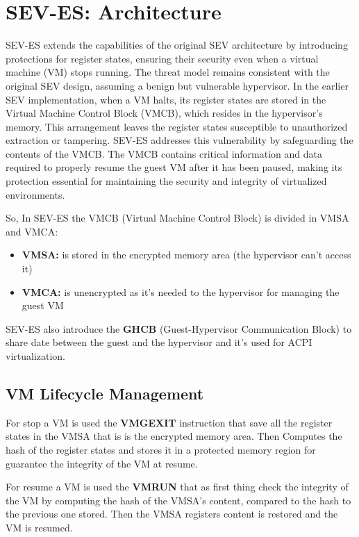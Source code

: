 \section{SEV-ES: Architecture}

SEV-ES extends the capabilities of the original SEV architecture by introducing protections for register states, 
ensuring their security even when a virtual machine (VM) stops running. 
The threat model remains consistent with the original SEV design, assuming a benign but vulnerable hypervisor. 
In the earlier SEV implementation, when a VM halts, its register states are stored in the Virtual Machine Control Block (VMCB), which resides in the hypervisor's memory. 
This arrangement leaves the register states susceptible to unauthorized extraction or tampering. SEV-ES addresses this vulnerability by safeguarding the contents of the VMCB. 
The VMCB contains critical information and data required to properly resume the guest VM after it has been paused, making its protection essential for maintaining the security and integrity of virtualized environments. \bigskip

So, In SEV-ES the VMCB (Virtual Machine Control Block) is divided in VMSA and VMCA:
\begin{itemize}
    \item \textbf{VMSA:} is stored in the encrypted memory area (the hypervisor can't access it)
    \item \textbf{VMCA:} is unencrypted as it's needed to the hypervisor for managing the guest VM
\end{itemize}

SEV-ES also introduce the \textbf{GHCB} (Guest-Hypervisor Communication Block) to share date between the guest and the hypervisor and it's used for ACPI virtualization.

\subsection{VM Lifecycle Management}

For stop a VM is used the \textbf{VMGEXIT} instruction that save all the register states in the VMSA that is is the encrypted memory area. 
Then Computes the hash of the register states and stores it in a protected memory region for guarantee the integrity of the VM at resume. \bigskip

For resume a VM is used the \textbf{VMRUN} that as first thing check the integrity of the VM by computing the hash of the VMSA's content, compared to the hash to the previous one stored.
Then the VMSA registers content is restored and the VM is resumed. 

